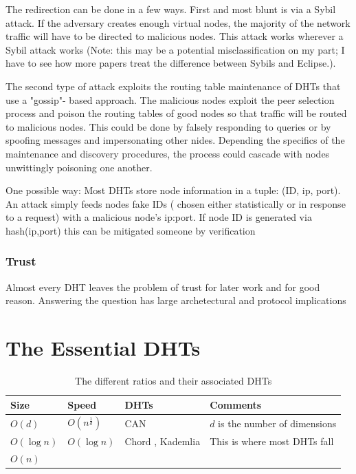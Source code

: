 \documentclass[10pt,letterpaper]{report}
\begin{document}
The redirection can be done in a few ways.  First and most blunt is via a Sybil attack.  If the adversary creates enough virtual nodes, the majority of the network traffic will have to be directed to malicious nodes.  This attack works wherever a Sybil attack works  (Note: this may be a potential  misclassification on my part; I have to see how more papers treat the difference between Sybils and Eclipse.).

The second type of attack exploits the routing table maintenance of DHTs that use a "gossip"- based approach.  The malicious nodes exploit the peer selection process and poison the routing tables of good nodes so that traffic will be routed to malicious nodes.  This could be done by falsely responding to queries or by spoofing messages and impersonating other nides.   Depending the specifics of  the maintenance and discovery procedures,  the process could cascade with nodes unwittingly poisoning one another.

One possible way:  Most DHTs store node information in a tuple: (ID, ip, port).  An attack simply feeds nodes fake IDs ( chosen either statistically or in response to a request) with a malicious node's ip:port.  If node ID is generated via hash(ip,port)  this can be mitigated someone by verification  


\subsection{Trust}
Almost every DHT leaves the problem of trust for later work and for good reason.
Answering the question has large archetectural and protocol implications %


\chapter{The Essential DHTs}%


\begin{table}
  \centering
  \begin{tabular}{|l|l|l|l|}
  \hline
  Size & Speed & DHTs & Comments \\ \hline
  
  $O(d)$ & $O(n^{\frac{1}{d}})$ & CAN \cite{can} & $d$ is the number of dimensions \\ \hline
  
  $O(\log n)$ & $O(\log n)$ & Chord \cite{chord}, Kademlia \cite{kademlia} & This is where most DHTs fall \\ \hline
  
  $O(n)$ &  & & \\ \hline
  \end{tabular}
  \caption{The different ratios and their associated DHTs}
  \label{tab:tradeoffs}
\end{table}
\end{document}
